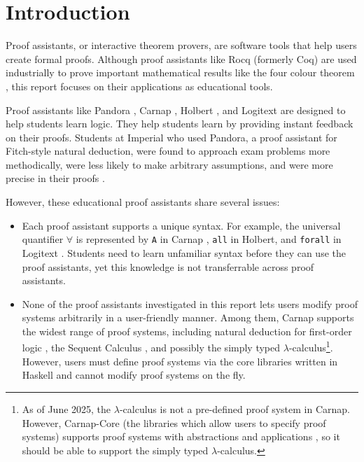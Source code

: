 \chapter{Introduction}
Proof assistants, or interactive theorem provers, are software tools that help users create formal proofs. Although proof assistants like Rocq (formerly Coq) are used industrially to prove important mathematical results like the four colour theorem \cite{gonthier:2008}, this report focuses on their applications as educational tools.

Proof assistants like Pandora \cite{pandora:2007, pandora}, Carnap \cite{carnap, carnap:2018}, Holbert \cite{oconnor:2022}, and Logitext \cite{yang:2022} are designed to help students learn logic. They help students learn by providing instant feedback on their proofs. Students at Imperial who used Pandora, a proof assistant for Fitch-style \cite{fitch:1952} natural deduction, were found to approach exam problems more methodically, were less likely to make arbitrary assumptions, and were more precise in their proofs \cite{pandora:2007}.

However, these educational proof assistants share several issues:
\begin{itemize}
    \item Each proof assistant supports a unique syntax. For example, the universal quantifier $\forall$ is represented by \lstinline{A} in Carnap \cite{carnap:systems}, \lstinline{all} in Holbert, and \lstinline{forall} in Logitext \cite{yang:2022}. Students need to learn unfamiliar syntax before they can use the proof assistants, yet this knowledge is not transferrable across proof assistants.
    \item None of the proof assistants investigated in this report lets users modify proof systems arbitrarily in a user-friendly manner. Among them, Carnap supports the widest range of proof systems, including natural deduction for first-order logic \cite{carnap:systems}, the Sequent Calculus \cite{carnap:systems}, and possibly the simply typed $\lambda$-calculus\footnote{As of June 2025, the $\lambda$-calculus is not a pre-defined proof system in Carnap. However, Carnap-Core (the libraries which allow users to specify proof systems) supports proof systems with abstractions and applications \cite{carnap:2018}, so it should be able to support the simply typed $\lambda$-calculus.}. However, users must define proof systems via the core libraries written in Haskell and cannot modify proof systems on the fly.
\end{itemize}

